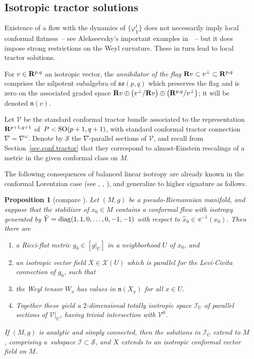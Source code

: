 \documentclass[10pt,a4paper]{amsart}
\numberwithin{equation}{section}
\newtheorem{prop}[thm]{Proposition}
\theoremstyle{definition}
\newcommand{\BR}{{\bf R}}
\def\n{{\mathfrak n}}
\newcommand{\so}{\mathfrak{so}}
\begin{document}
\subsection{Isotropic tractor solutions}

Existence of a flow with the dynamics of $\bigl\{ \varphi^t_Y \bigr\}$ does not necessarily imply local conformal flatness~-- see Alekseevsky's important examples in~\cite{alekseevski.selfsim}~-- but it does impose strong restrictions on the Weyl curvature. These in turn lead to local tractor solutions.

For $v \in \BR^{p,q}$ an isotropic vector, the \emph{annihilator of the flag} $\BR v \subset v^\perp \subset \BR^{p,q}$ comprises the nilpotent subalgebra of $\so(p,q)$ which preserves the flag and is zero on the associated graded space $\BR v \oplus \bigl( v^\perp/\BR v \bigr) \oplus \bigl( \BR^{p,q}/v^\perp \bigr)$; it will be denoted $\n(v)$.

Let $\mathcal{V}$ be the standard conformal tractor bundle associated to the representation $\BR^{p+1,q+1}$ of~${P < {\rm SO}(p+1,q+1)}$, with standard conformal tractor connection $\nabla = \nabla^\omega$. Denote by $\mathcal{S}$ the $\nabla$-parallel sections of $\mathcal{V}$, and recall from Section~\ref{sec.conf.tractor} that they correspond to almost-Einstein rescalings of a metric in the given conformal class on $M$.

The following consequences of balanced linear isotropy are already known in the conformal Lorentzian case (see \cite[Lemma~6.5 and Theorem~1.3\,(2)]{frances.degenerescence}, \cite[Section~4]{mp.confdambra}, \cite[Proposition~5.1]{dfmpz.balanced}),
and generalize to higher signature as follows.

\begin{prop}[compare \cite{dfmpz.balanced,frances.degenerescence,mp.confdambra}]
\label{prop.balanced.weyl}
Let $(M,g)$ be a pseudo-Riemannian manifold, and suppose that the stabilizer of $x_0 \in M$ contains a conformal flow  with isotropy generated by $\check{Y} = {\rm diag}(1,1, 0 , \dots, 0, -1,-1 )$ with respect to $\hat{x}_0 \in \pi^{-1}(x_0)$. Then there are
\begin{enumerate}\itemsep=0pt
\item[$(1)$] a Ricci-flat metric $g_0 \in [ g |_U]$ in a neighborhood $U$ of $x_0$, and
\item[$(2)$] an isotropic vector field $X \in \mathcal{X}(U)$ which is parallel for the Levi-Civita connection of $g_0$, such that
\item[$(3)$] the Weyl tensor $W_x$ has values in $\n(X_x)$ for all $x \in U$.
\item[$(4)$] Together these yield a $2$-dimensional totally isotropic space $\mathcal{I}_U$ of parallel sections of $ \mathcal{V} |_U$, having trivial intersection with $\mathcal{V}^0$.
\end{enumerate}
If $(M,g)$ is analytic and simply connected, then the solutions in $\mathcal{I}_U$ extend to $M$, comprising a~subspace $\mathcal{I} \subset \mathcal{S}$, and $X$ extends to an isotropic conformal vector field on $M$.
\end{prop}
\end{document}
